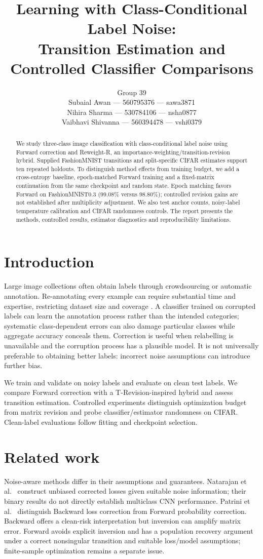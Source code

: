 \documentclass[12pt]{article}
\title{\fontsize{14}{17}\selectfont Learning with Class-Conditional Label Noise:\\
Transition Estimation and Controlled Classifier Comparisons}
\author{\normalfont\fontsize{12}{14.5}\selectfont
Group 39\\
\normalfont Subaial Awan --- 560795376 --- sawa3871\\
\normalfont Nihira Sharma --- 530784106 --- nsha0877\\
\normalfont Vaibhavi Shivanna --- 560394478 --- vshi0379}
\begin{document}
\maketitle
\begin{abstract}
We study three-class image classification with class-conditional label noise using Forward correction and Reweight-R, an importance-weighting/transition-revision hybrid. Supplied FashionMNIST transitions and split-specific CIFAR estimates support ten repeated holdouts. To distinguish method effects from training budget, we add a cross-entropy baseline, epoch-matched Forward training and a fixed-matrix continuation from the same checkpoint and random state. Epoch matching favors Forward on FashionMNIST0.3 (99.08\% versus 98.80\%); controlled revision gains are not established after multiplicity adjustment. We also test anchor counts, noisy-label temperature calibration and CIFAR randomness controls. The report presents the methods, controlled results, estimator diagnostics and reproducibility limitations.
\end{abstract}

\section{Introduction}
Large image collections often obtain labels through crowdsourcing or automatic annotation. Re-annotating every example can require substantial time and expertise, restricting dataset size and coverage \cite{rolnick2017,xia2019}. A classifier trained on corrupted labels can learn the annotation process rather than the intended categories; systematic class-dependent errors can also damage particular classes while aggregate accuracy conceals them. Correction is useful when relabelling is unavailable and the corruption process has a plausible model. It is not universally preferable to obtaining better labels: incorrect noise assumptions can introduce further bias.

We train and validate on noisy labels and evaluate on clean test labels. We compare Forward correction with a T-Revision-inspired hybrid and assess transition estimation. Controlled experiments distinguish optimization budget from matrix revision and probe classifier/estimator randomness on CIFAR. Clean-label evaluations follow fitting and checkpoint selection.

\section{Related work}
Noise-aware methods differ in their assumptions and guarantees. Natarajan et al.~\cite{natarajan2013} construct unbiased corrected losses given suitable noise information; their binary results do not directly establish multiclass CNN performance. Patrini et al.~\cite{patrini2017} distinguish Backward loss correction from Forward probability correction. Backward offers a clean-risk interpretation but inversion can amplify matrix error. Forward avoids explicit inversion and has a population recovery argument under a correct nonsingular transition and suitable loss/model assumptions; finite-sample optimization remains a separate issue.
\end{document}
